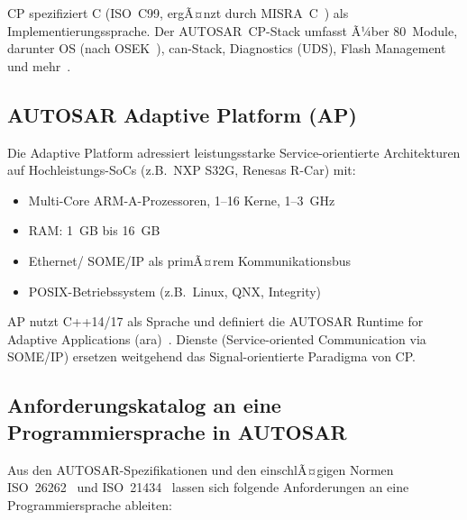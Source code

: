 ﻿\documentclass[12pt,a4paper,twoside]{article}
\begin{document}
CP spezifiziert C (ISO~C99, ergÃ¤nzt durch MISRA~C~\cite{misra_c2012})
als Implementierungssprache. Der AUTOSAR~CP-Stack umfasst Ã¼ber 80~Module,
darunter OS (nach OSEK~\cite{osek_spec}), \gls{can}-Stack, Diagnostics (UDS),
Flash Management und mehr~\cite{autosar_cp_r23}.

\subsection{AUTOSAR Adaptive Platform (AP)}
\label{subsec:ap}

Die Adaptive Platform adressiert leistungsstarke Service-orientierte Architekturen
auf Hochleistungs-SoCs (z.B.\ NXP S32G, Renesas R-Car) mit:
\begin{itemize}
  \item Multi-Core ARM-A-Prozessoren, 1--16 Kerne, 1--3~GHz
  \item RAM: 1~GB bis 16~GB
  \item Ethernet/ SOME/IP als primÃ¤rem Kommunikationsbus
  \item POSIX-Betriebssystem (z.B.\ Linux, QNX, Integrity)
\end{itemize}

AP nutzt C++14/17 als Sprache und definiert die
AUTOSAR Runtime for Adaptive Applications (\gls{ara})~\cite{autosar_ap_explained2019}.
Dienste (Service-oriented Communication via SOME/IP) ersetzen weitgehend
das Signal-orientierte Paradigma von CP.

\subsection{Anforderungskatalog an eine Programmiersprache in AUTOSAR}
\label{subsec:anforderungen}

Aus den AUTOSAR-Spezifikationen und den einschlÃ¤gigen Normen
ISO~26262~\cite{iso26262_2018} und ISO~21434~\cite{iso21434_2021}
lassen sich folgende Anforderungen an eine Programmiersprache ableiten:
\end{document}
